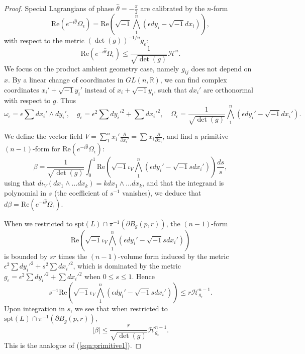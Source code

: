 \documentclass{article}
\theoremstyle{definition}
\newcommand{\R}{\mathbb{R}}
\begin{document}
				\begin{proof}
			Special Lagrangians of phase $\hat{\theta}=-\frac{\pi}{2}$ are calibrated by the $n$-form
			\[
			\text{Re}(e^{-i\hat{\theta} } \Omega_\epsilon)= \text{Re}(    \sqrt{-1} \bigwedge_1^n( \epsilon dy_i- \sqrt{-1} dx_i     ) ),
		\]
		with respect to the metric $   (\det(g))^{-1/n}   g_\epsilon  $:
		\begin{equation}\label{eqn:specialLagcalibration}
			\text{Re}(e^{-i\hat{\theta} } \Omega_\epsilon) \leq  \frac{1}{  \sqrt{\det(g) } } \mathcal{H}^n.
		\end{equation}
			We focus on the product ambient geometry case, namely $g_{ij}$ does not depend on $x$. By a linear change of coordinates in $GL(n,\R)$, we can find complex coordinates $x_i' + \sqrt{-1} y_i'$ instead of $x_i+ \sqrt{-1} y_i$, such that $dx_i'$ are orthonormal with respect to $g$. Thus
		\[
		\omega_\epsilon= \epsilon \sum dx_i' \wedge dy_i',\quad  g_\epsilon= \epsilon^2 \sum dy_i'^2+ \sum dx_i'^2,\quad \Omega_\epsilon=\frac{1}{  \sqrt{\det(g) } } \bigwedge_1^n( \epsilon dy_i'- \sqrt{-1} dx_i'     ).
		\]
		
		
		
		
		
		
		
		
		We define the vector field $V= \sum_1^n x_i' \frac{\partial}{\partial x_i'}=\sum x_i  \frac{\partial}{\partial x_i}$, and find a primitive $(n-1)$-form for $	\text{Re}(e^{-i\hat{\theta} } \Omega_\epsilon)$:
		\begin{equation}
		\beta= \frac{1}{  \sqrt{\det(g) }  } \int_0^1   \text{Re}(    \sqrt{-1} \iota_V \bigwedge_1^n( \epsilon dy_i'- \sqrt{-1} sdx_i'     ) ) \frac{ds}{s},
		\end{equation}
		using that $d\iota_V ( dx_1\wedge \ldots dx_k)= k dx_1\wedge \ldots dx_k$, and that the integrand is polynomial in $s$ (the coefficient of $s^{-1}$ vanishes), we deduce that $d\beta= 	\text{Re}(e^{-i\hat{\theta} } \Omega_\epsilon)$.
		
		
		  When we restricted to $\text{spt}(L)\cap \pi^{-1} (\partial B_g(p,r))$,  the $(n-1)$-form 
\[
\text{Re}(    \sqrt{-1} \iota_V \bigwedge_1^n( \epsilon dy_i'- \sqrt{-1} sdx_i'     ) )  
\]
		is bounded by $sr$ times the $(n-1)$-volume form induced by the metric 
		$\epsilon^2\sum dy_i'^2+ s^2 \sum dx_i'^2$, which is dominated by the metric $g_\epsilon=\epsilon^2\sum dy_i'^2+  \sum dx_i'^2$ when $0\leq s\leq 1$. Hence
		\[
	s^{-1}	\text{Re}(    \sqrt{-1} \iota_V \bigwedge_1^n( \epsilon dy_i'- \sqrt{-1} sdx_i'     ) )  \leq r \mathcal{H}^{n-1}_{g_\epsilon} .
		\]
		Upon integration in $s$, we see that when restricted to $\text{spt}(L)\cap \pi^{-1} (\partial B_g(p,r))$,
		\begin{equation}\label{eqn:primitive2}
			  |\beta |  \leq  \frac{r}{    \sqrt{\det(g) }    }\mathcal{H}^{n-1}_{g_\epsilon} .
			\end{equation}
		This is the analogue of (\ref{eqn:primitive1}).
		

\end{proof}
\end{document}
